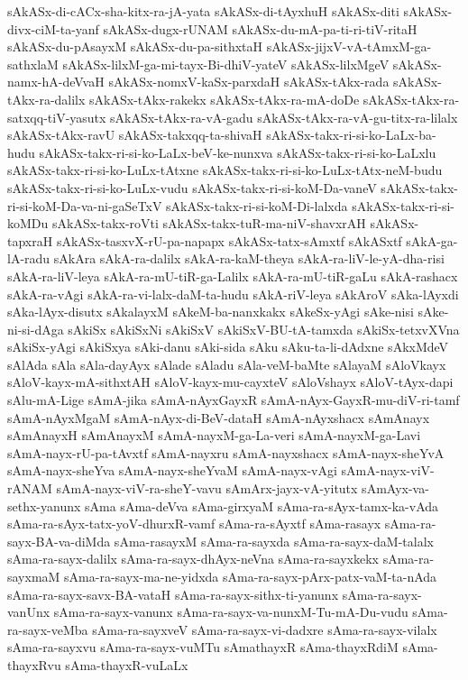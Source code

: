 {sAkASx-di-cACx-sha-kitx-ra-jA-yata
sAkASx-di-tAyxhuH
sAkASx-diti
sAkASx-divx-ciM-ta-yanf
sAkASx-dugx-rUNAM
sAkASx-du-mA-pa-ti-ri-tiV-ritaH
sAkASx-du-pAsayxM
sAkASx-du-pa-sithxtaH
sAkASx-jijxV-vA-tAmxM-ga-sathxlaM
sAkASx-lilxM-ga-mi-tayx-Bi-dhiV-yateV
sAkASx-lilxMgeV
sAkASx-namx-hA-deVvaH
sAkASx-nomxV-kaSx-parxdaH
sAkASx-tAkx-rada
sAkASx-tAkx-ra-dalilx
sAkASx-tAkx-rakekx
sAkASx-tAkx-ra-mA-doDe
sAkASx-tAkx-ra-satxqq-tiV-yasutx
sAkASx-tAkx-ra-vA-gadu
sAkASx-tAkx-ra-vA-gu-titx-ra-lilalx
sAkASx-tAkx-ravU
sAkASx-takxqq-ta-shivaH
sAkASx-takx-ri-si-ko-LaLx-ba-hudu
sAkASx-takx-ri-si-ko-LaLx-beV-ke-nunxva
sAkASx-takx-ri-si-ko-LaLxlu
sAkASx-takx-ri-si-ko-LuLx-tAtxne
sAkASx-takx-ri-si-ko-LuLx-tAtx-neM-budu
sAkASx-takx-ri-si-ko-LuLx-vudu
sAkASx-takx-ri-si-koM-Da-vaneV
sAkASx-takx-ri-si-koM-Da-va-ni-gaSeTxV
sAkASx-takx-ri-si-koM-Di-lalxda
sAkASx-takx-ri-si-koMDu
sAkASx-takx-roVti
sAkASx-takx-tuR-ma-niV-shavxrAH
sAkASx-tapxraH
sAkASx-tasxvX-rU-pa-napapx
sAkASx-tatx-sAmxtf
sAkASxtf
sAkA-ga-lA-radu
sAkAra
sAkA-ra-dalilx
sAkA-ra-kaM-theya
sAkA-ra-liV-le-yA-dha-risi
sAkA-ra-liV-leya
sAkA-ra-mU-tiR-ga-Lalilx
sAkA-ra-mU-tiR-gaLu
sAkA-rashacx
sAkA-ra-vAgi
sAkA-ra-vi-lalx-daM-ta-hudu
sAkA-riV-leya
sAkAroV
sAka-lAyxdi
sAka-lAyx-disutx
sAkalayxM
sAkeM-ba-nanxkakx
sAkeSx-yAgi
sAke-nisi
sAke-ni-si-dAga
sAkiSx
sAkiSxNi
sAkiSxV
sAkiSxV-BU-tA-tamxda
sAkiSx-tetxvXVna
sAkiSx-yAgi
sAkiSxya
sAki-danu
sAki-sida
sAku
sAku-ta-li-dAdxne
sAkxMdeV
sAlAda
sAla
sAla-dayAyx
sAlade
sAladu
sAla-veM-baMte
sAlayaM
sAloVkayx
sAloV-kayx-mA-sithxtAH
sAloV-kayx-mu-cayxteV
sAloVshayx
sAloV-tAyx-dapi
sAlu-mA-Lige
sAmA-jika
sAmA-nAyxGayxR
sAmA-nAyx-GayxR-mu-diV-ri-tamf
sAmA-nAyxMgaM
sAmA-nAyx-di-BeV-dataH
sAmA-nAyxshacx
sAmAnayx
sAmAnayxH
sAmAnayxM
sAmA-nayxM-ga-La-veri
sAmA-nayxM-ga-Lavi
sAmA-nayx-rU-pa-tAvxtf
sAmA-nayxru
sAmA-nayxshacx
sAmA-nayx-sheYvA
sAmA-nayx-sheYva
sAmA-nayx-sheYvaM
sAmA-nayx-vAgi
sAmA-nayx-viV-rANAM
sAmA-nayx-viV-ra-sheY-vavu
sAmArx-jayx-vA-yitutx
sAmAyx-va-sethx-yanunx
sAma
sAma-deVva
sAma-girxyaM
sAma-ra-sAyx-tamx-ka-vAda
sAma-ra-sAyx-tatx-yoV-dhurxR-vamf
sAma-ra-sAyxtf
sAma-rasayx
sAma-ra-sayx-BA-va-diMda
sAma-rasayxM
sAma-ra-sayxda
sAma-ra-sayx-daM-talalx
sAma-ra-sayx-dalilx
sAma-ra-sayx-dhAyx-neVna
sAma-ra-sayxkekx
sAma-ra-sayxmaM
sAma-ra-sayx-ma-ne-yidxda
sAma-ra-sayx-pArx-patx-vaM-ta-nAda
sAma-ra-sayx-savx-BA-vataH
sAma-ra-sayx-sithx-ti-yanunx
sAma-ra-sayx-vanUnx
sAma-ra-sayx-vanunx
sAma-ra-sayx-va-nunxM-Tu-mA-Du-vudu
sAma-ra-sayx-veMba
sAma-ra-sayxveV
sAma-ra-sayx-vi-dadxre
sAma-ra-sayx-vilalx
sAma-ra-sayxvu
sAma-ra-sayx-vuMTu
sAmathayxR
sAma-thayxRdiM
sAma-thayxRvu
sAma-thayxR-vuLaLx
}
